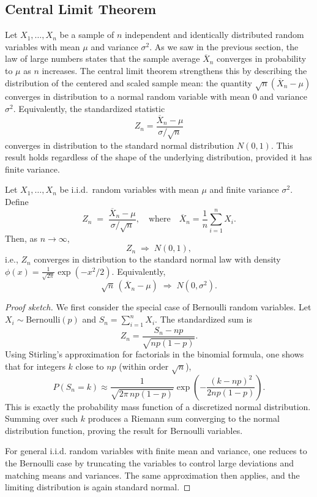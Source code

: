 
\subsection{Central Limit Theorem}

Let $X_1, \ldots, X_n$ be a sample of $n$ independent and identically distributed random variables with mean $\mu$ and variance $\sigma^2$. As we saw in the previous section, the law of large numbers states that the sample average $\overline{X}_n$ converges in probability to $\mu$ as $n$ increases. The central limit theorem strengthens this by describing the distribution of the centered and scaled sample mean: the quantity $\sqrt{n}(\overline{X}_n-\mu)$ converges in distribution to a normal random variable with mean $0$ and variance $\sigma^2$. Equivalently, the standardized statistic
\[
Z_n=\frac{\overline{X}_n-\mu}{\sigma/\sqrt{n}}
\]
converges in distribution to the standard normal distribution $N(0,1)$. This result holds regardless of the shape of the underlying distribution, provided it has finite variance.

\begin{theorem}\label{th:central_limit_theorem_pdf}
Let $X_{1}, \ldots, X_{n}$ be i.i.d.\ random variables with mean $\mu$ and finite variance $\sigma^{2}$. Define
\[
Z_n \;=\; \frac{\overline{X}_{n}-\mu}{\sigma/\sqrt{n}},
\quad\text{where}\quad
\overline{X}_{n} = \frac{1}{n} \sum_{i=1}^{n} X_i.
\]
Then, as $n \to \infty$,
\[
Z_n \;\Rightarrow\; N(0,1),
\]
i.e., $Z_n$ converges in distribution to the standard normal law with density $\phi(x)=\frac{1}{\sqrt{2\pi}}\exp(-x^2/2)$.
Equivalently,
\[
\sqrt{n}\,(\overline{X}_n-\mu) \;\Rightarrow\; N(0,\sigma^2).
\]
\end{theorem}
\begin{proof}[Proof sketch]
We first consider the special case of Bernoulli random variables.  
Let $X_i \sim \mathrm{Bernoulli}(p)$ and $S_n = \sum_{i=1}^n X_i$.  
The standardized sum is
\[
Z_n = \frac{S_n - np}{\sqrt{np(1-p)}}.
\]
Using Stirling's approximation for factorials in the binomial formula, one shows that for integers $k$ close to $np$ (within order $\sqrt{n}$),
\[
P(S_n = k) \approx \frac{1}{\sqrt{2\pi\,np(1-p)}} 
  \exp\!\left(-\frac{(k-np)^2}{2np(1-p)}\right).
\]
This is exactly the probability mass function of a discretized normal distribution.  
Summing over such $k$ produces a Riemann sum converging to the normal distribution function, proving the result for Bernoulli variables.

For general i.i.d. random variables with finite mean and variance, one reduces to the Bernoulli case by truncating the variables to control large deviations and matching means and variances. 
The same approximation then applies, and the limiting distribution is again standard normal.
\end{proof}

